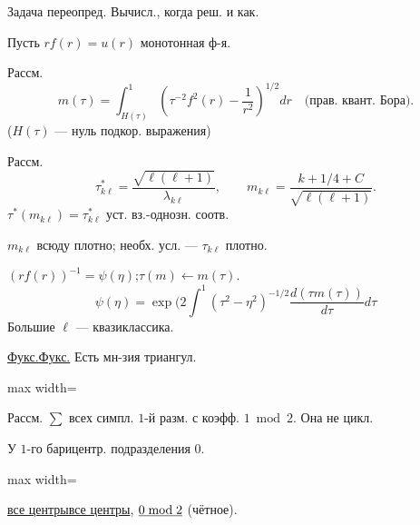\documentclass[11pt]{article}
\theoremstyle{definition}
\theoremstyle{remark}
\let\DiplomaticMathUnderline\underline
\renewcommand{\underline}[1]{\ifmmode\DiplomaticMathUnderline{#1}\else\uline{#1}\fi}
\begin{document}
Задача переопред. Вычисл., когда реш. и как.

Пусть $rf(r)=u(r)$ монотонная ф-я.

Рассм.
\begin{equation*}
m(\tau)=\int_{H(\tau)}^1\left(\tau^{-2}f^2(r)-\frac1{r^2}\right)^{1/2}dr
\quad\text{(прав. квант. Бора)}.
\end{equation*}
($H(\tau)$ — нуль подкор. выражения)

Рассм.
\begin{equation*}
\tau^*_{k\ell}=\frac{\sqrt{\ell(\ell+1)}}{\lambda_{k\ell}},\qquad
m_{k\ell}=\frac{k+1/4+C}{\sqrt{\ell(\ell+1)}}.
\end{equation*}
$\tau^*(m_{k\ell})=\tau^*_{k\ell}$ уст. вз.-однозн. соотв.

$m_{k\ell}$ всюду плотно;
необх. усл. — $\tau_{k\ell}$ плотно.

$(rf(r))^{-1}=\psi(\eta)$;\qquad $\tau(m)\leftarrow m(\tau)$.
\begin{equation*}
\psi(\eta)=\exp(2\int^1(\tau^2-\eta^2)^{-1/2}
\frac{d(\tau m(\tau))}{d\tau}d\tau
\end{equation*}
Большие $\ell$ — квазиклассика.

\underline{Фукс.} Есть мн-зия триангул.
\begin{center}
\begin{adjustbox}{max width=\linewidth}
\end{adjustbox}
\end{center}
Рассм. $\sum$ всех симпл. $1$-й разм. с коэфф. $1\bmod2$. Она не цикл.

У $1$-го барицентр. подразделения $0$.
\begin{center}
\begin{adjustbox}{max width=\linewidth}
\end{adjustbox}
\end{center}
\underline{все центры}, $\underline{0\bmod2}$ (чётное).
\end{document}
